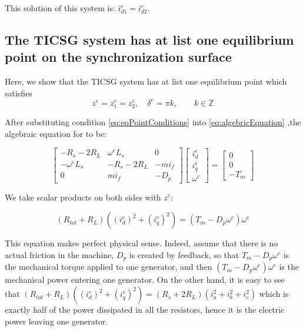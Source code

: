 \documentclass[conference]{IEEEtran}
\begin{document}
This solution of this system is: $i_{d1}^{e}=i_{d2}^{e}$.



\subsection{The TICSG system has at list one equilibrium point on the synchronization surface}
Here, we show that the TICSG system has at list one equilibrium point which satisfies 
\begin{equation}
z^{e}=z_{1}^{e}=z_{2}^{e},\quad \delta^e=\pi k,\qquad k\in\mathbb{Z}\label{eq:eqPointConditions}
\end{equation}

After substituting condition \eqref{eq:eqPointConditions} into \eqref{eq:algebricEquation} ,the algebraic equation for  to be:

\begin{equation}
\left[\begin{array}{ccc}
-R_{s}-2R_{L} & \omega^{e}L_{s} & 0\\
-\omega^{e}L_{s} & -R_{s}-2R_{L} & -mi_{f}\\
0 & mi_{f} & -D_{p}
\end{array}\right]\left[\begin{array}{c}
i_{d}^{e}\\
i_{q}^{e}\\
\omega^{e}
\end{array}\right]=\left[\begin{array}{c}
0\\
0\\
-T_{m}
\end{array}\right]\label{eq:equilbrium_algebric_eq}
\end{equation}

We take scalar products on both sides with $z^{e}$:

\[
\left(R_{tot}+R_{L}\right)\left((i_{d}^{e})^{2}+(i_{q}^{e})^{2}\right)=\left(T_{m}-D_{p}\omega^{e}\right)\omega^{e}
\]

This equation makes perfect physical sense. Indeed, assume that there
is no actual friction in the machine, $D_{p}$ is created by feedback,
so that $T_{m}-D_{p}\omega^{e}$ is the mechanical torque applied
to one generator, and then $\left(T_{m}-D_{p}\omega^{e}\right)\omega^{e}$
is the mechanical power entering one generator. On the other hand,
it is easy to see that $\left(R_{tot}+R_{L}\right)\left((i_{d}^{e})^{2}+(i_{q}^{e})^{2}\right)=\left(R_{s}+2R_{L}\right)\left(i_{a}^{2}+i_{b}^{2}+i_{c}^{2}\right)$
which is exactly half of the power dissipated in all the resistors,
hence it is the electric power leaving one generator.
\end{document}
